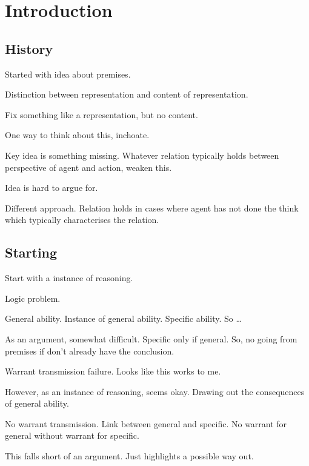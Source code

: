 \chapter{Introduction}
\label{cha:introduction}

\section{History}

\begin{note}
  Started with idea about premises.

  Distinction between representation and content of representation.

  Fix something like a representation, but no content.

  One way to think about this, inchoate.
\end{note}

\begin{note}
  Key idea is something missing.
  Whatever relation typically holds between perspective of agent and action, weaken this.
\end{note}

\begin{note}
  Idea is hard to argue for.
\end{note}

\begin{note}
  Different approach.
  Relation holds in cases where agent has not done the think which typically characterises the relation.
\end{note}

\section{Starting}
\nocite{Brown:2004us}

\begin{note}
  Start with a instance of reasoning.

  Logic problem.

  General ability.
  Instance of general ability.
  Specific ability.
  So \dots

  As an argument, somewhat difficult.
  Specific only if general.
  So, no going from premises if don't already have the conclusion.

  Warrant transmission failure.
  Looks like this works to me.

  However, as an instance of reasoning, seems okay.
  Drawing out the consequences of general ability.

  No warrant transmission.
  Link between general and specific.
  No warrant for general without warrant for specific.

  This falls short of an argument.
  Just highlights a possible way out.
\end{note}

